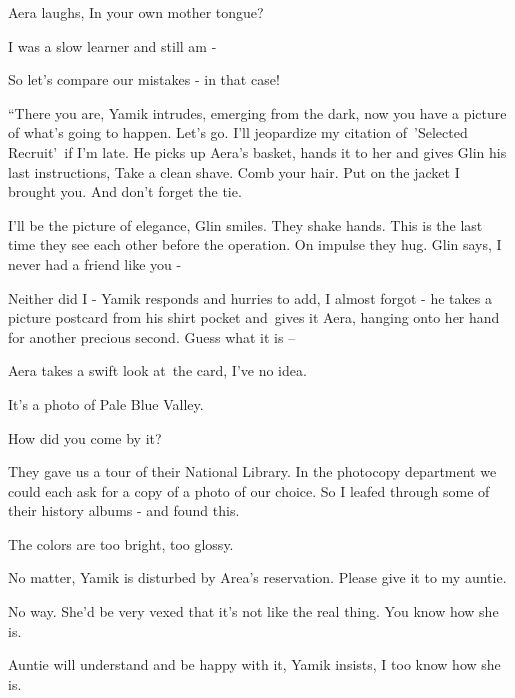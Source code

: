 \documentclass[letterpaper]{article}
\begin{document}
Aera laughs, {\textquotedbl}In your own mother tongue?{\textquotedbl} 

{\textquotedbl}I was a slow learner and still am -{\textquotedbl} 

{\textquotedbl}So let's compare our mistakes - in that case!{\textquotedbl} 

{}``There you are,{\textquotedbl} Yamik intrudes, emerging from the dark, {\textquotedbl}now you have a picture of
what's going to happen. Let's go. I'll jeopardize my citation of\ {}'Selected Recruit{}'\ if I'm late.{\textquotedbl}
He picks up Aera's basket, hands it to her and gives Glin his last instructions, {\textquotedbl}Take a clean shave.
Comb your hair. Put on the jacket I brought you. And don't forget the tie.{\textquotedbl} 

{\textquotedbl}I'll be the picture of elegance,{\textquotedbl} Glin smiles. They shake hands. This is the last time they
see each other before the operation. On impulse they hug. Glin says, {\textquotedbl}I never had a friend like you
-{\textquotedbl} 

{\textquotedbl}Neither did I -{\textquotedbl} Yamik responds and hurries to add, {\textquotedbl}I almost forgot
-{\textquotedbl} he takes a picture postcard from his shirt pocket and~gives it Aera, hanging onto her hand for another
precious second. {\textquotedbl}Guess what it is --{\textquotedbl} 

Aera takes a swift look at\textcolor{red}{\ }the card, {\textquotedbl}I've no idea.{\textquotedbl} 

{\textquotedbl}It's a photo of Pale Blue Valley.{\textquotedbl} 

{\textquotedbl}How did you come by it?{\textquotedbl} \ 

{\textquotedbl}They gave us a tour of their National Library. In the photocopy department we could each ask for a copy
of a photo of our choice. So I leafed through some of their history albums - and found this.{\textquotedbl} 

{\textquotedbl}The colors are too bright, too glossy.{\textquotedbl} 

{\textquotedbl}No matter,{\textquotedbl} Yamik is disturbed by Area's reservation. {\textquotedbl}Please give it to my
auntie.{\textquotedbl} 

{\textquotedbl}No way. She'd be very vexed that it's not like the real thing. You know how she is.{\textquotedbl} 

{\textquotedbl}Auntie will understand and be happy with it,{\textquotedbl} Yamik insists, {\textquotedbl}I too know how
she is.{\textquotedbl}
\end{document}
